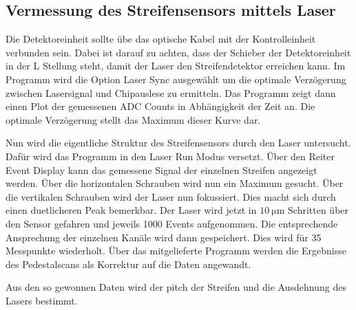 \subsection{Vermessung des Streifensensors mittels Laser}
\label{sec:laserdurch}

Die Detektoreinheit sollte übe das optische Kabel mit der Kontrolleinheit verbunden sein.
Dabei ist darauf zu achten, dass der Schieber der Detektoreinheit in der L Stellung steht, damit der Laser den Streifendetektor erreichen kann.
Im Programm wird die Option Laser Sync ausgewählt um die optimale Verzögerung zwischen Lasersignal und Chipauslese zu ermitteln.
Das Programm zeigt dann einen Plot der gemessenen ADC Counts in Abhängigkeit der Zeit an.
Die optimale Verzögerung stellt das Maximum dieser Kurve dar.

Nun wird die eigentliche Struktur des Streifensensors durch den Laser untersucht.
Dafür wird das Programm in den Laser Run Modus versetzt.
Über den Reiter Event Display kann das gemessene Signal der einzelnen Streifen angezeigt werden.
Über die horizontalen Schrauben wird nun ein Maximum gesucht.
Über die vertikalen Schrauben wird der Laser nun fokussiert.
Dies macht sich durch einen duetlicheren Peak bemerkbar.
Der Laser wird jetzt in $\SI{10}{\micro\metre}$ Schritten über den Sensor gefahren und jeweils 1000 Events aufgenommen.
Die entsprechende Ansprechung der einzelnen Kanäle wird dann gespeichert.
Dies wird für 35 Messpunkte wiederholt.
Über das mitgelieferte Programm werden die Ergebnisse des Pedestalscans als Korrektur auf die Daten angewandt.

Aus den so gewonnen Daten wird der pitch der Streifen und die Ausdehnung des Lasers bestimmt.
